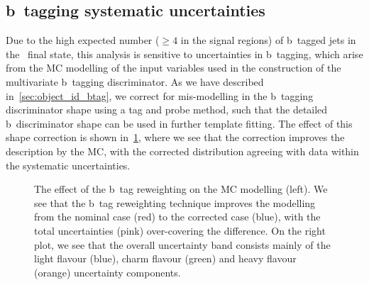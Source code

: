 \subsection{b~tagging systematic uncertainties}
\label{sec:btag_unc}
Due to the high expected number ($\geq4$ in the signal regions) of b~tagged jets in the~\ttHbb\xspace final state, this analysis is sensitive to uncertainties in b~tagging, which arise from the MC modelling of the input variables used in the construction of the multivariate b~tagging discriminator. As we have described in~\cref{sec:object_id_btag}, we correct for mis-modelling in the b~tagging discriminator shape using a tag and probe method, such that the detailed b~discriminator shape can be used in further template fitting. The effect of this shape correction is shown in~\cref{fig:tth_btag_rew}, where we see that the correction improves the description by the MC, with the corrected distribution agreeing with data within the systematic uncertainties.

\begin{figure}
\begin{centering}
\caption[b~tagging reweighting and uncertainty]{The effect of the b~tag reweighting on the MC modelling (left). We see that the b~tag reweighting technique improves the modelling from the nominal case (red) to the corrected case (blue), with the total uncertainties (pink) over-covering the difference. On the right plot, we see that the overall uncertainty band consists mainly of the light flavour (blue), charm flavour (green) and heavy flavour (orange) uncertainty components.}
\label{fig:tth_btag_rew}
\end{centering}
\end{figure}

